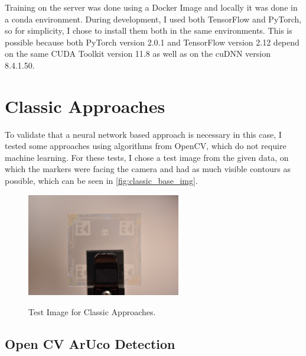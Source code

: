 \documentclass[10pt]{book}
\newcommand{\figureref}[1]{\autoref{#1}}
\begin{document}
Training on the server was done using a Docker Image and locally it was done in a conda environment. During development, I used both TensorFlow and PyTorch, so for simplicity, I chose to install them both in the same environments. This is possible because both PyTorch version 2.0.1 and TensorFlow version 2.12 depend on the same CUDA Toolkit version 11.8 as well as on the cuDNN version 8.4.1.50. %

\section{Classic Approaches}

To validate that a neural network based approach is necessary in this case, I tested some approaches using algorithms from \ac{OpenCV}, which do not require machine learning. For these tests, I chose a test image from the given data, on which the markers were facing the camera and had as much visible contours as possible, which can be seen in \figureref{fig:classic_base_img}. 

\begin{figure}
  \caption{Test Image for Classic Approaches.}
  \includegraphics[width=0.6\textwidth]{image/classic_base_img}
  \label{fig:classic_base_img}
\end{figure}

\subsection{Open CV ArUco Detection}
\end{document}
